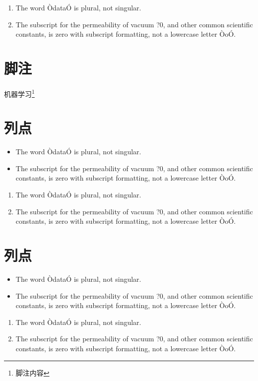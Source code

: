 \documentclass[letterpaper, 10pt, conference, twoside]{ieeeconf}
\begin{document}
\begin{enumerate}
\item The word ÒdataÓ is plural, not singular.
\item The subscript for the permeability of vacuum ?0, and other common scientific constants, is zero with subscript formatting, not a lowercase letter ÒoÓ.
\end{enumerate}


\section{脚注}
机器学习\footnote{脚注内容}

\section{列点}

\begin{itemize}
\item The word ÒdataÓ is plural, not singular.
\item The subscript for the permeability of vacuum ?0, and other common scientific constants, is zero with subscript formatting, not a lowercase letter ÒoÓ.
\end{itemize}

\begin{enumerate}
\item The word ÒdataÓ is plural, not singular.
\item The subscript for the permeability of vacuum ?0, and other common scientific constants, is zero with subscript formatting, not a lowercase letter ÒoÓ.
\end{enumerate}


\section{列点}

\begin{itemize}
\item The word ÒdataÓ is plural, not singular.
\item The subscript for the permeability of vacuum ?0, and other common scientific constants, is zero with subscript formatting, not a lowercase letter ÒoÓ.
\end{itemize}

\begin{enumerate}
\item The word ÒdataÓ is plural, not singular.
\item The subscript for the permeability of vacuum ?0, and other common scientific constants, is zero with subscript formatting, not a lowercase letter ÒoÓ.
\end{enumerate}
\end{document}
